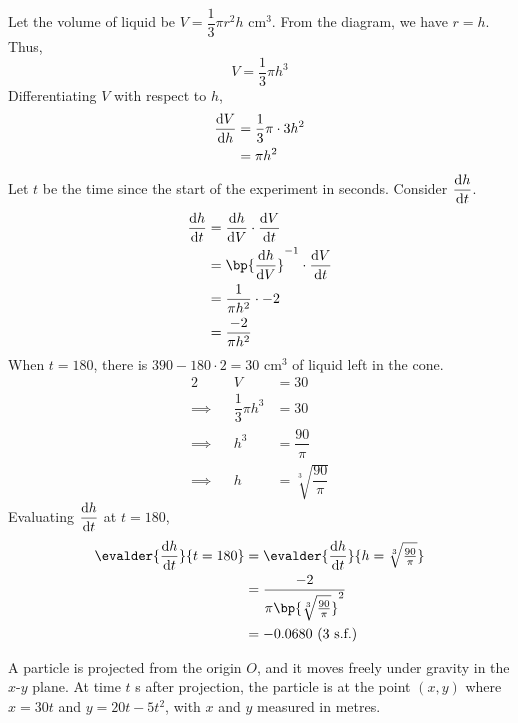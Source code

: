 \documentclass{echw}
\begin{document}
        Let the volume of liquid be $V = \dfrac13 \pi r^2 h$ cm$^3$. From the diagram, we have $r = h$. Thus,
        \[
            V = \dfrac13 \pi h^3
        \]
        Differentiating $V$ with respect to $h$,
        \begin{align*}
            \dfrac{\mathrm{d} V}{\mathrm{d} h}&= \dfrac13 \pi \cdot 3 h^2\\
            &= \pi h^2
        \end{align*}
        Let $t$ be the time since the start of the experiment in seconds. Consider $\dfrac{\mathrm{d} h}{\mathrm{d} t}$.
        \begin{align*}
            \der{h}{t} &= \der{h}{V} \cdot \der{V}{t}\\
            &= \bp{\der{h}{V}}^{-1} \cdot \der{V}{t}\\
            &= \dfrac1{\pi h^2} \cdot -2\\
            &= \dfrac{-2}{\pi h^2}
        \end{align*}
        When $t = 180$, there is $390 - 180\cdot2 = 30$ cm$^3$ of liquid left in the cone.
        \begin{alignat*}{2}
            &&V &= 30\\
            \implies&&\dfrac13 \pi h^3 &= 30\\
            \implies&&h^3 &= \dfrac{90}{\pi}\\
            \implies&&h &= \sqrt[3]{\dfrac{90}{\pi}}
        \end{alignat*}
        Evaluating $\dfrac{\mathrm{d} h}{\mathrm{d} t}$ at $t =180$,
        \begin{align*}
            \evalder{\der{h}{t}}{t = 180} &= \evalder{\der{h}{t}}{h = \sqrt[3]{\tfrac{90}{\pi}}}\\
            &= \dfrac{-2}{\pi \bp{\sqrt[3]{\tfrac{90}{\pi}}}^2}\\
            &= -0.0680 \tosf{3}
        \end{align*}



    \problem{}
        A particle is projected from the origin $O$, and it moves freely under gravity in the $x$-$y$ plane. At time $t$ s after projection, the particle is at the point $(x,y)$ where $x=30t$ and $y=20t-5t^2$, with $x$ and $y$ measured in metres.
\end{document}
